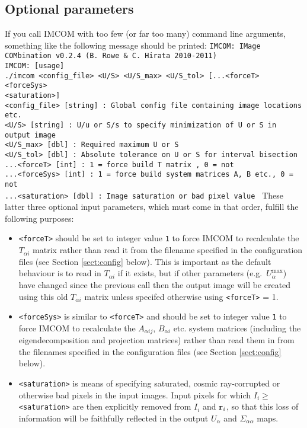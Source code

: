 \documentclass[10pt]{article}
\begin{document}
\subsection{Optional parameters}
If you call IMCOM with too few (or far too many) command line arguments, something like the following message should be printed:
\newline \newline
\texttt{IMCOM: IMage COMbination v0.2.4 (B. Rowe \& C. Hirata 2010-2011) \\
IMCOM: [usage] \\
 ./imcom <config\_file> <U/S> <U/S\_max> <U/S\_tol> [...<forceT> <forceSys> \\ <saturation>] \\
 \newline
  <config\_file> [string] : Global config file containing image locations etc. \\
  <U/S> [string] : U/u or S/s to specify minimization of U or S in output image \\
  <U/S\_max> [dbl]         : Required maximum U or S \\
  <U/S\_tol> [dbl]         : Absolute tolerance on U or S for interval bisection \\
 ...<forceT> [int]           : 1 = force build T matrix , 0 = not                 \\
   ...<forceSys> [int]      : 1 = force build system matrices A, B etc., 0 = not  \\
   ...<saturation> [dbl] : Image saturation or bad pixel value                 }
\newline \newline
These latter three optional input parameters, which must come in that order, fulfill the following purposes:
\begin{itemize}
\item \texttt{<forceT>} should be set to integer value \texttt{1} to force IMCOM to recalculate the $T_{\alpha i}$ matrix rather than read it from the filename specified in the configuration files (see Section \ref{sect:config} below).  This is important as the default behaviour is to read in $T_{\alpha i }$ if it exists, but if other parameters (e.g.\ $U_{\alpha}^{\textrm{max}}$) have changed since the previous call then the output image will be created using this old $T_{\alpha i}$ matrix unless specifed otherwise using \texttt{<forceT>} = 1.
\item \texttt{<forceSys>} is similar to \texttt{<forceT>} and should be set to integer value \texttt{1} to force IMCOM to recalculate the $A_{\alpha ij}$, $B_{\alpha i}$ etc. system matrices (including the eigendecomposition and projection matrices) rather than read them in from the filenames specified in the configuration files (see Section \ref{sect:config} below). 
\item \texttt{<saturation>} is means of specifying saturated, cosmic ray-corrupted or otherwise bad pixels in the input images.  Input pixels for which $I_i \ge $ \texttt{<saturation>} are then explicitly removed from $I_i$ and ${\bf r}_i$, so that this loss of information will be faithfully reflected in the output $U_{\alpha}$ and $\Sigma_{\alpha \alpha}$ maps.
\end{itemize}
\end{document}
